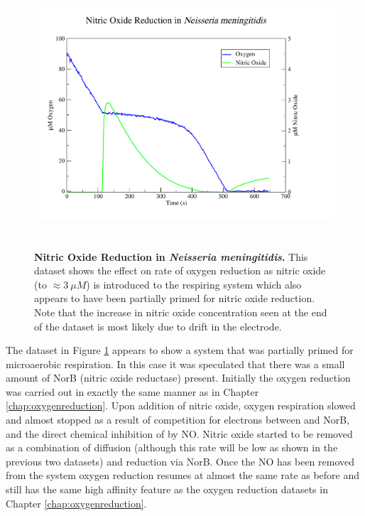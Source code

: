 \begin{figure}[tbp]
 \centering
 \includegraphics[height=10cm, trim=1cm 1cm 3cm 1cm, clip=true]{./06-noreduction/data/aer-no-data.pdf}
 \caption[{Nitric Oxide Reduction in \textit{Neisseria meningitidis}.}]{{\bf Nitric Oxide Reduction in \textit{Neisseria meningitidis}.} This dataset shows the effect on rate of oxygen reduction as nitric oxide (to $\approx 3~\mu M$) is introduced to the respiring system which also appears to have been partially primed for nitric oxide reduction. Note that the increase in nitric oxide concentration seen at the end of the dataset is most likely due to drift in the electrode.}
 \label{fig:nodata}
\end{figure}
The dataset in Figure \ref{fig:nodata} appears to show a system that was partially primed for microaerobic respiration. In this case it was speculated that there was a small amount of NorB (nitric oxide reductase) present. Initially the oxygen reduction was carried out in exactly the same manner as in Chapter \ref{chap:oxygenreduction}. Upon addition of nitric oxide, oxygen respiration slowed and almost stopped as a result of competition for electrons between \cbbthree{} and NorB, and the direct chemical inhibition of \cbbthree{} by NO. Nitric oxide started to be removed as a combination of diffusion (although this rate will be low as shown in the previous two datasets) and reduction via NorB. Once the NO has been removed from the system oxygen reduction resumes at almost the same rate as before and still has the same high affinity feature as the oxygen reduction datasets in Chapter \ref{chap:oxygenreduction}.

